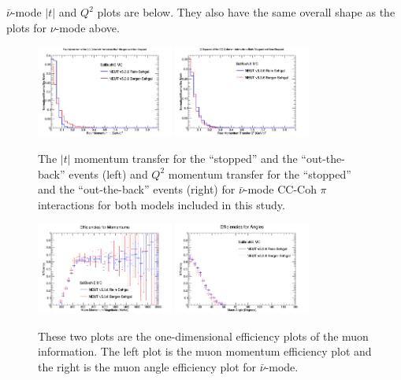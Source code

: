 \documentclass[11pt]{article}
\begin{document}
$\bar{\nu}$-mode $|t|$ and $Q^2$ plots are below. They also have the same overall shape as the plots for $\nu$-mode above.

\begin{figure}[H]
\centering
\includegraphics[width=0.4\textwidth]{CCCohPlots/ANMCCCohGoodT.png}
\includegraphics[width=0.4\textwidth]{CCCohPlots/ANMCCCohGoodQ2.png}
\caption{The $|t|$ momentum transfer for the ``stopped'' and the ``out-the-back'' events (left) and $Q^2$ momentum transfer for the ``stopped'' and the ``out-the-back'' events (right) for $\bar{\nu}$-mode CC-Coh $\pi$ interactions for both models included in this study.}
\label{fig:AntiNuModeCCCohGoodTAndQ2}
\end{figure}





\begin{figure}[H]
\centering
\includegraphics[width=0.4\textwidth]{ANMCombinedPlotsImages/18-ANMCombinedPlots.png}
\includegraphics[width=0.4\textwidth]{ANMCombinedPlotsImages/17-ANMCombinedPlots.png}
\caption{These two plots are the one-dimensional efficiency plots of the muon information. The left plot is the muon momentum efficiency plot and the right is the muon angle efficiency plot for $\bar{\nu}$-mode.}
\label{fig:MomAngEffANM}
\end{figure}
\end{document}
